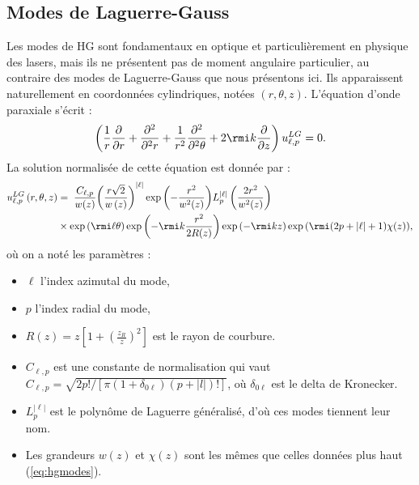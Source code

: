 \subsection{Modes de Laguerre-Gauss}
\label{sec:LGmodes}
Les modes de HG sont fondamentaux en optique et particulièrement en physique des lasers, mais ils ne présentent pas de moment angulaire particulier, au contraire des modes de Laguerre-Gauss que nous présentons ici. Ils apparaissent naturellement en coordonnées cylindriques, notées $(r,\theta,z)$. L'équation d'onde paraxiale s'écrit :
\begin{equation*}
\left(\frac{1}{r}\frac{\partial}{\partial r} + \frac{\partial^2}{\partial^2 r} + \frac{1}{r^2}\frac{\partial^2}{\partial^2 \theta} + 2\rmi k\frac{\partial}{\partial z}\right)u^{LG}_{\ell, p}=0.
\end{equation*}
La solution normalisée de cette équation est donnée par : 
\begin{align}
{u^{LG}_{\ell,p} }\left( {r,\theta ,z} \right) &= {\;}\frac{C_{\ell,p}}{w(z)}
{\left( {\frac{r\sqrt{2}}{{w\left(z\right)}}} \right)^{\left| \ell  \right|}}
\exp{\left(- \frac{{{r^2}}}{{{{w^2(z)}}}}\right)}
L_p^{\left| \ell  \right|}\left(\frac{2r^2}{w^2(z)}\right)\nonumber\\
&\times
\exp{({\rmi}\ell \theta )}
\exp{\left(-{\rmi}k\frac{r^2}{2R(z)}\right)}
\exp{(-{\rmi}kz)}
\exp{(\rmi(2p+\left|\ell\right|+1)\chi(z))},
\label{eq:lgmodes}
\end{align} 
où on a noté les paramètres :
\begin{itemize}
\renewcommand{\labelitemi}{$\bullet$}
\setlength\itemsep{1em}
\item $\ell$ l'index azimutal du mode,
\item $p$ l'index radial du mode,
\item $R(z)=z\left[1+\left(\frac{z_R}{z}\right)^2\right]$ est le rayon de courbure.
\item $C_{\ell,p}$ est une constante de normalisation qui vaut $C_{\ell,p}=\sqrt{2p!/\left[\pi(1+\delta_{0\ell})(p+\left|l\right|)!\right]}$, où $\delta_{0\ell}$ est le delta de Kronecker.
\item $L_p^{\left| \ell  \right|}$ est le polynôme de Laguerre généralisé, d'où ces modes tiennent leur nom. 
\item Les grandeurs $w(z)$ et $\chi(z)$ sont les mêmes que celles données plus haut (\ref{eq:hgmodes}).
\end{itemize}

